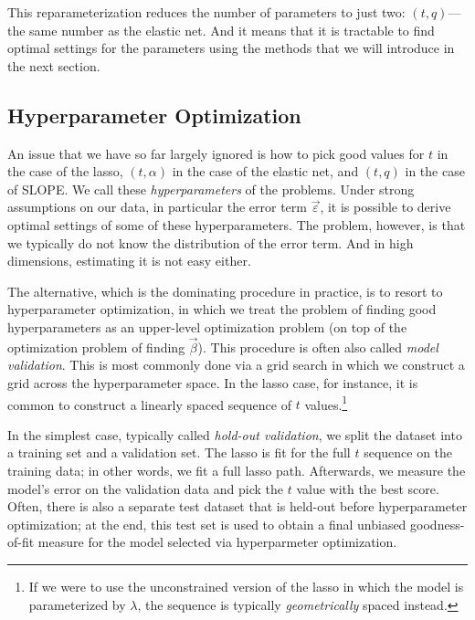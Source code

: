 This reparameterization reduces the number of parameters to just two: \((t,q)\)---the same number as the elastic net. And it means that it is tractable to find optimal settings for the parameters using the methods that we will introduce in the next section.

\subsection{Hyperparameter Optimization}

An issue that we have so far largely ignored is how to pick good values for \(t\) in the case of the lasso, \((t,\alpha)\) in the case of the elastic net, and \((t, q)\) in the case of SLOPE. We call these \emph{hyperparameters} of the problems. Under strong assumptions on our data, in particular the error term \(\vec{\varepsilon}\), it is possible to derive optimal settings of some of these hyperparameters. The problem, however, is that we typically do not know the distribution of the error term. And in high dimensions, estimating it is not easy either.

The alternative, which is the dominating procedure in practice, is to resort to hyperparameter optimization, in which we treat the problem of finding good hyperparameters as an upper-level optimization problem (on top of the optimization problem of finding \(\vec{\beta}\)). This procedure is often also called \emph{model validation}. This is most commonly done via a grid search in which we construct a grid across the hyperparameter space. In the lasso case, for instance, it is common to construct a linearly spaced sequence of \(t\) values.\footnote{If we were to use the unconstrained version of the lasso in which the model is parameterized by \(\lambda\), the sequence is typically \emph{geometrically} spaced instead.}

In the simplest case, typically called \emph{hold-out validation}, we split the dataset into a training set and a validation set. The lasso is fit for the full \(t\) sequence on the training data; in other words, we fit a full lasso path. Afterwards, we measure the model's error on the validation data and pick the \(t\) value with the best score. Often, there is also a separate test dataset that is held-out before hyperparameter optimization; at the end, this test set is used to obtain a final unbiased goodness-of-fit measure for the model selected via hyperparmeter optimization.

